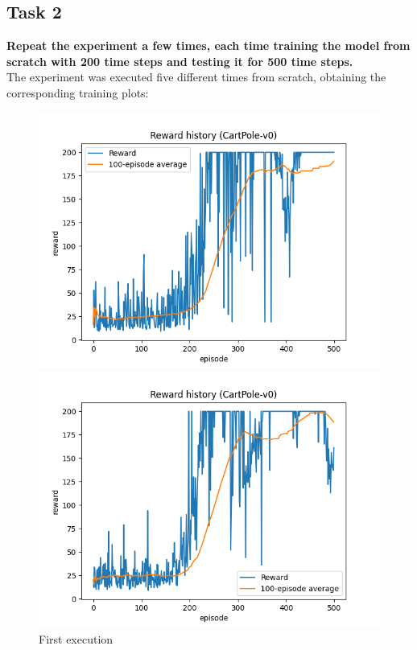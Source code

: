 \documentclass[12pt]{article}
\begin{document}
\subsection{Task 2}
\label{sec:task-2}
\textbf {
    Repeat the experiment a few times, each time training the model from scratch with 200 time steps and testing it for 500 time steps.
}\\

The experiment was executed five different times from scratch, obtaining the corresponding training plots:

\begin{figure}[H]
   \begin{minipage}{0.32\textwidth}
     \centering
     \includegraphics[width=\linewidth]{exercise-1/report/img/task-2-v1.png}
     \caption{First execution}
     \label{fig:task-2-v1}
   \end{minipage}\hfill
   \begin{minipage}{0.32\textwidth}
     \centering
     \includegraphics[width=\linewidth]{exercise-1/report/img/task-2-v2.png}

\end{minipage}
\end{figure}
\end{document}
